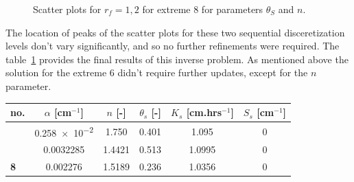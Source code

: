 \documentclass[review]{elsarticle}
\begin{document}
\begin{figure}[htb!]
\label{ext6rf1-an2-example}
\caption{Scatter plots for $r_f=1,2$ for extreme 8 for parameters $\theta_S$ and $n$.}
\end{figure}


The location of peaks of the scatter plots for these two sequential disceretization levels don't vary significantly, and so no further refinements were required. The table~\ref{shp-vysledky} provides the final results of this inverse problem. As mentioned above the solution for the extreme 6 didn't require further updates, except for  the $n$ parameter. 

\begin{table}[ht]
 \begin{footnotesize}
\begin{tabular}{l || c c c c c }
no. & $\alpha$ [cm$^{-1}$] & $n$ [-] & $\theta_s$ [-] & $K_s$ [cm.hrs$^{-1}$] & $S_s$  [cm$^{-1}$]\\ \hline \hline
\rowcolor{white}{\bf 6} & \num{0.258e-2} & 1.750  & 0.401 &  \num{1.095} & 0  \\ 
\rowcolor{white}{\bf 7} & \num{0.0032285} & 1.4421 & 0.513 &  \num{1.0995} & 0  \\ 
\rowcolor{white} {\bf 8} & \num{0.002276} & 1.5189 & 0.236 &  \num{1.0356} &  \num{0}\\ \hline
\end{tabular}
 \end{footnotesize}
\label{shp-vysledky}
\end{table}
\end{document}
